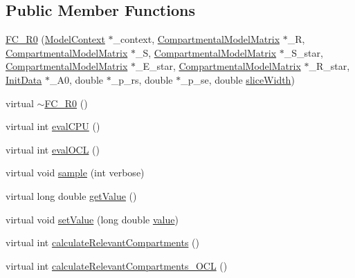 \subsection*{Public Member Functions}
\begin{DoxyCompactItemize}
\item 
\hyperlink{classSpatialSEIR_1_1FC__R0_a64aeaca573ebf93865c48e12d10b0a9e}{F\-C\-\_\-\-R0} (\hyperlink{classSpatialSEIR_1_1ModelContext}{Model\-Context} $\ast$\-\_\-context, \hyperlink{classSpatialSEIR_1_1CompartmentalModelMatrix}{Compartmental\-Model\-Matrix} $\ast$\-\_\-\-R, \hyperlink{classSpatialSEIR_1_1CompartmentalModelMatrix}{Compartmental\-Model\-Matrix} $\ast$\-\_\-\-S, \hyperlink{classSpatialSEIR_1_1CompartmentalModelMatrix}{Compartmental\-Model\-Matrix} $\ast$\-\_\-\-S\-\_\-star, \hyperlink{classSpatialSEIR_1_1CompartmentalModelMatrix}{Compartmental\-Model\-Matrix} $\ast$\-\_\-\-E\-\_\-star, \hyperlink{classSpatialSEIR_1_1CompartmentalModelMatrix}{Compartmental\-Model\-Matrix} $\ast$\-\_\-\-R\-\_\-star, \hyperlink{classSpatialSEIR_1_1InitData}{Init\-Data} $\ast$\-\_\-\-A0, double $\ast$\-\_\-p\-\_\-rs, double $\ast$\-\_\-p\-\_\-se, double \hyperlink{classSpatialSEIR_1_1FullConditional_a150ee031af8d086ad0a04b13630a110f}{slice\-Width})
\item 
virtual \hyperlink{classSpatialSEIR_1_1FC__R0_a5d86241914862fb692ffbffb8d1798f3}{$\sim$\-F\-C\-\_\-\-R0} ()
\item 
virtual int \hyperlink{classSpatialSEIR_1_1FC__R0_a0a7321f7437898caad90229e67ce7e12}{eval\-C\-P\-U} ()
\item 
virtual int \hyperlink{classSpatialSEIR_1_1FC__R0_a36373b69de6603391aceb7c326b2cc00}{eval\-O\-C\-L} ()
\item 
virtual void \hyperlink{classSpatialSEIR_1_1FC__R0_afee9585fb8a21f38002912896c85b529}{sample} (int verbose)
\item 
virtual long double \hyperlink{classSpatialSEIR_1_1FC__R0_ab52e48b7be8eb46258602b0d1467ff08}{get\-Value} ()
\item 
virtual void \hyperlink{classSpatialSEIR_1_1FC__R0_a6b21261ddd1928e70dfea6ef25d553bd}{set\-Value} (long double \hyperlink{classSpatialSEIR_1_1FC__R0_a9ef45e653aff78f2fc3e589d1efbfdf2}{value})
\item 
virtual int \hyperlink{classSpatialSEIR_1_1FC__R0_a651e144af6767ba90b59ae04f3164c28}{calculate\-Relevant\-Compartments} ()
\item 
virtual int \hyperlink{classSpatialSEIR_1_1FC__R0_ad94da8ac1a1b746f1902e709d4f81634}{calculate\-Relevant\-Compartments\-\_\-\-O\-C\-L} ()
\end{DoxyCompactItemize}
